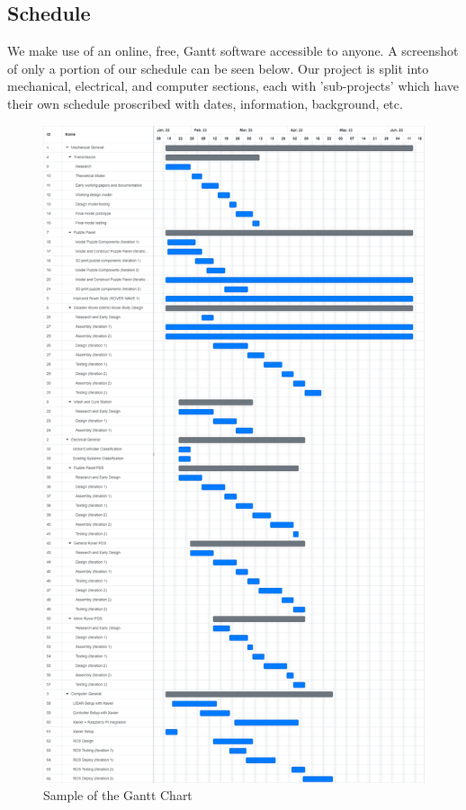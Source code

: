 \documentclass[a4paper, 10pt]{article}
\begin{document}
	\subsection{Schedule}
	We make use of an online, free, Gantt software accessible to anyone. A screenshot of only a portion of our schedule can be seen below. Our project is split into mechanical, electrical, and computer sections, each with 'sub-projects' which have their own schedule proscribed with dates, information, background, etc.

	\begin{figure} [!h]
		\centering
		\includegraphics[scale=0.2]{Photos/Gantt Chart}
		\caption{Sample of the Gantt Chart}
		\label{gantt_chart}
	\end{figure}
\end{document}
